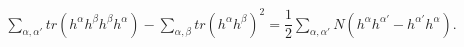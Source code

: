 \documentclass[leqno,11pt]{amsart}
\theoremstyle{plain}
\theoremstyle{definition}
\numberwithin{equation}{section}
\begin{document}
\begin{eqnarray}
\sum_{\alpha,\alpha'}tr(h^{\alpha}h^{\beta}h^{\beta}h^{\alpha})-\sum_{\alpha,\beta}tr(h^{\alpha}h^{\beta})^2=\dfrac{1}{2}\sum_{\alpha,\alpha'}N(h^{\alpha}h^{\alpha'}-h^{\alpha'}h^{\alpha}).
\end{eqnarray}
\end{document}
